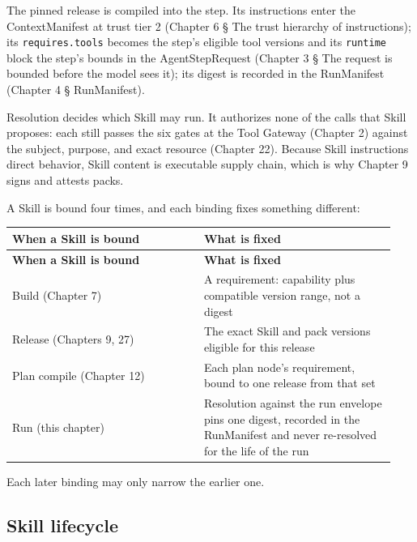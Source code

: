 The pinned release is compiled into the step. Its instructions enter the ContextManifest at trust tier 2 (Chapter 6 § The trust hierarchy of instructions); its \lstinline[style=bookinline]!requires.tools! becomes the step's eligible tool versions and its \lstinline[style=bookinline]!runtime! block the step's bounds in the AgentStepRequest (Chapter 3 § The request is bounded before the model sees it); its digest is recorded in the RunManifest (Chapter 4 § RunManifest).\par

Resolution decides which Skill may run. It authorizes none of the calls that Skill proposes: each still passes the six gates at the Tool Gateway (Chapter 2) against the subject, purpose, and exact resource (Chapter 22). Because Skill instructions direct behavior, Skill content is executable supply chain, which is why Chapter 9 signs and attests packs.\par

A Skill is bound four times, and each binding fixes something different:\par

\BookTableStart
\small
\begin{longtable}{@{}Y{0.4700\linewidth}Y{0.4700\linewidth}@{}}
\color{white}\bfseries \textbf{When a Skill is bound} & \color{white}\bfseries \textbf{What is fixed} \\
\endfirsthead
{}
\color{white}\bfseries \textbf{When a Skill is bound} & \color{white}\bfseries \textbf{What is fixed} \\
\endhead
Build (Chapter 7) & A requirement: capability plus compatible version range, not a digest \\
Release (Chapters 9, 27) & The exact Skill and pack versions eligible for this release \\
Plan compile (Chapter 12) & Each plan node's requirement, bound to one release from that set \\
Run (this chapter) & Resolution against the run envelope pins one digest, recorded in the RunManifest and never re-resolved for the life of the run \\
\end{longtable}
\BookTableEnd

Each later binding may only narrow the earlier one.\par

\subsection{Skill lifecycle}

